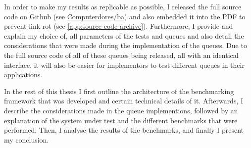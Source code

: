 In order to make my results as replicable as possible, I released the full source code on Github (see
\href{https://github.com/Computerdores/ba}{Computerdores/ba}) and also embedded it into the PDF to prevent
link rot (see \autoref{app:source-code-archive}).
Furthermore, I provide and explain my choice of, all parameters of the tests and queues and also detail the
considerations that were made during the implementation of the queues.
Due to the full source code of all of these queues being released, all with an identical interface, it will
also be easier for implementors to test different queues in their applications.

In the rest of this thesis I first outline the architecture of the benchmarking framework that was developed
and certain technical details of it.
Afterwards, I describe the considerations made in the queue implementions, followed by an explanation of the
system under test and the different benchmarks that were performed.
Then, I analyse the results of the benchmarks, and finally I present my conclusion.
